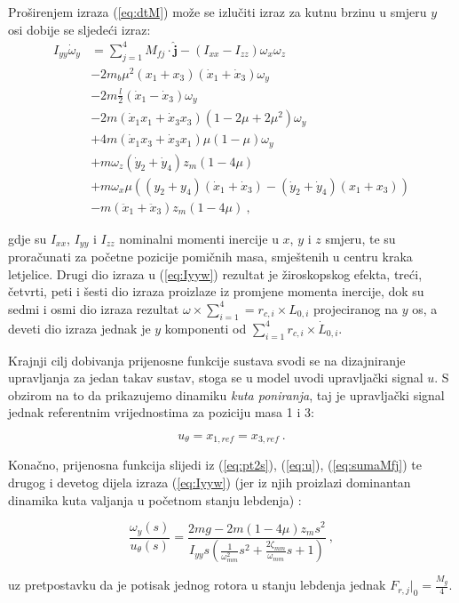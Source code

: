 \documentclass[11pt,a4paper]{article}
\begin{document}
Proširenjem izraza (\ref{eq:dtM}) može se izlučiti izraz za kutnu brzinu u smjeru $y$ osi dobije se sljedeći izraz:
\begin{equation}
\begin{split}
I_{yy}\dot{\omega}_{y}  & = \sum_{j=1}^{4}M_{fj}\cdot  \bm{\hat{j}} - (I_{xx} - I_{zz})\omega_{x}\omega_{z} \\
&- 2m_{b}\mu^{2}(x_{1} + x_{3})(\dot{x}_{1} + \dot{x}_{3} )\omega_{y} \\
&- 2m\frac{l}{2}(\dot{x}_{1} - \dot{x}_{3})\omega_{y} \\
&- 2m(\dot{x}_{1}x_{1} + \dot{x}_{3}x_{3})(1-2\mu + 2\mu^{2})\omega_{y} \\
&+ 4m(\dot{x}_{1}x_{3} + \dot{x}_{3}x_{1})\mu(1-\mu)\omega_{y} \\
&+ m \omega_{z}(\dot{y}_{2} + \dot{y}_{4})z_{m}(1-4\mu) \\
&+ m\omega_{x}\mu ((y_{2} + y_{4})(\dot{x}_{1} + \dot{x}_{3})-(\dot{y}_{2} + \dot{y}_{4})(x_{1} + x_{3})) \\
&- m(\ddot{x}_{1} + \ddot{x}_{3})z_{m}(1 - 4\mu) \ ,
\end{split}
\label{eq:Iyyw}
\end{equation}

gdje su $I_{xx}$, $I_{yy}$ i $I_{zz}$ nominalni momenti inercije u $x$, $y$ i $z$ smjeru, te su proračunati za početne pozicije pomičnih masa, smještenih u centru kraka letjelice. Drugi dio izraza u (\ref{eq:Iyyw}) rezultat je žiroskopskog efekta, treći, četvrti, peti i šesti dio izraza proizlaze iz promjene momenta inercije, dok su sedmi i osmi dio izraza rezultat $\omega \times \sum_{i=1}^{4} = r_{c,i}\times L_{0,i}$ projeciranog na $y$ os, a deveti dio izraza jednak je $y$ komponenti od $\sum_{i=1}^{4}r_{c,i}\times \dot{L}_{0,i}$.  

\medskip

Krajnji cilj dobivanja prijenosne funkcije sustava svodi se na dizajniranje upravljanja za jedan takav sustav, stoga se u model uvodi upravljački signal $u$. S obzirom na to da prikazujemo dinamiku \textit{kuta poniranja}, taj je upravljački signal jednak referentnim vrijednostima za poziciju masa 1 i 3:

\begin{equation}
 u_{\theta} = x_{1, ref} = x_{3, ref} \ .
 \label{eq:u}
 \end{equation} 

Konačno, prijenosna funkcija slijedi iz (\ref{eq:pt2s}), (\ref{eq:u}), (\ref{eq:sumaMfj}) te drugog i devetog dijela izraza (\ref{eq:Iyyw}) (jer iz njih proizlazi dominantan dinamika kuta valjanja u početnom stanju lebdenja) \cite{haus2} \cite{haus3}:

\begin{equation}
\boxed{
\frac{\omega_{y}(s)}{u_{\theta}(s)} = \frac{2mg - 2m(1-4\mu)z_{m}s^{2}}{I_{yy}s \left(\frac{1}{\omega_{mm}^{2}}s^{2} + \frac{2\zeta_{mm}}{\omega_{mm}}s + 1  \right)}
} \ ,
\label{eq:tf}
\end{equation}

uz pretpostavku da je potisak jednog rotora u stanju lebdenja jednak $F_{r,j}|_{0} = \frac{M_{g}}{4}$.
\end{document}
